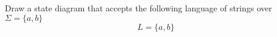 Draw a state diagram that accepts the following
language of strings over $\Sigma =
\{ a, b \}$ 
\[
L = \{a, b\}
\]
